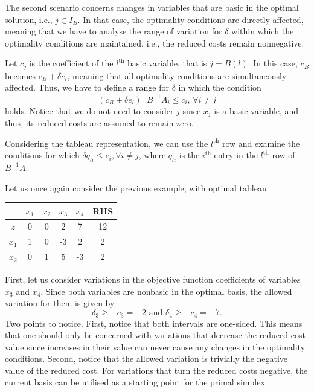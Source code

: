 The second scenario concerns changes in variables that are basic in the optimal solution, i.e., $j \in I_B$. In that case, the optimality conditions are directly affected, meaning that we have to analyse the range of variation for $\delta$ within which the optimality conditions are maintained, i.e., the reduced costs remain nonnegative.

Let $c_j$ is the coefficient of the $l^{\text{th}}$ basic variable, that is $j = B(l)$. In this case, $c_B$ becomes $c_B + \delta e_l$, meaning that all optimality conditions are simultaneously affected. Thus, we have to define a range for $\delta$ in which the condition
%
\begin{equation*}
	(c_B + \delta e_l)^\top B^{-1}A_i \leq c_i, \, \forall i \neq j 
\end{equation*}
%
holds. Notice that we do not need to consider $j$ since $x_j$ is a basic variable, and thus, its reduced costs are assumed to remain zero.

Considering the tableau representation, we can use the $l^{\text{th}}$ row and examine the conditions for which $\delta q_{li} \leq \overline{c}_i, \forall i \neq j$, where $q_{li}$ is the $i^{\text{th}}$ entry in the $l^{\text{th}}$ row of $B^{-1}A$.

Let us once again consider the previous example, with optimal tableau 

\begin{center}
	\begin{tabular}{c|cccc|c} 
	   &$x_1$ & $x_2$ & $x_3$ & $x_4$& RHS \\ \hline	
	   $z$ & 0 & 0 & 2 & 7 & 12\\
	   $x_1$ & 1 & 0 & -3 & 2 & 2\\
	   $x_2$ & 0 & 1 & 5 & -3 & 2\\	            
	\end{tabular}	
\end{center}

First, let us consider variations in the objective function coefficients of variables $x_3$ and $x_4$. Since both variables are nonbasic in the optimal basis, the allowed variation for them is given by
%
\begin{equation*}
	\delta_3 \geq -\overline{c}_3 = -2 \text{ and } 
    \delta_4 \geq -\overline{c}_4 = -7. 	
\end{equation*}
%
Two points to notice. First, notice that both intervals are one-sided. This means that one should only be concerned with variations that decrease the reduced cost value since increases in their value can never cause any changes in the optimality conditions. Second, notice that the allowed variation is trivially the negative value of the reduced cost. For variations that turn the reduced costs negative, the current basis can be utilised as a starting point for the primal simplex.

